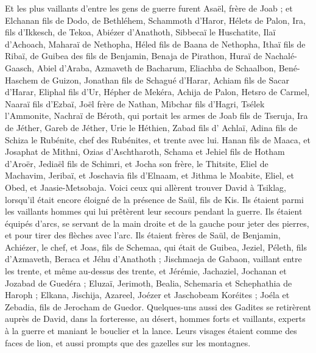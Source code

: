 \begin{multicols}{2}
Et les plus vaillants d'entre les gens de guerre furent Asaël, frère de Joab ; et Elchanan fils de Dodo, de Bethléhem,
Schammoth d'Haror, Hélets de Palon,
Ira, fils d'Ikkesch, de Tekoa, Abiézer d'Anathoth,
Sibbecaï le Huschatite, Ilaï d'Achoach,
Maharaï de Nethopha, Héled fils de Baana de Nethopha,
Ithaï fils de Ribaï, de Guibea des fils de Benjamin, Benaja de Pirathon,
Huraï de Nachalé-Gaasch, Abiel d'Araba,
Azmaveth de Bacharum, Eliachba de Schaalbon,
Bené-Haschem de Guizon, Jonathan fils de Schagué d'Harar,
Achiam fils de Sacar d'Harar, Eliphal fils d'Ur,
Hépher de Mekéra, Achija de Palon,
Hetsro de Carmel, Naaraï fils d'Ezbaï,
Joël frère de Nathan, Mibchar fils d'Hagri,
Tsélek l'Ammonite, Nachraï de Béroth, qui portait les armes de Joab fils de Tseruja,
Ira de Jéther, Gareb de Jéther,
Urie le Héthien, Zabad fils d' Achlaï,
Adina fils de Schiza le Rubénite, chef des Rubénites, et trente avec lui.
Hanan fils de Maaca, et Josaphat de Mithni,
Ozias d'Aschtharoth, Schama et Jehiel fils de Hotham d'Aroër,
Jediaël fils de Schimri, et Jocha son frère, le Thitsite,
Eliel de Machavim, Jeribaï, et Joschavia fils d'Elnaam, et Jithma le Moabite,
Eliel, et Obed, et Jaasie-Metsobaja.
\VerseOne{}Voici ceux qui allèrent trouver David à Tsiklag, lorsqu'il était encore éloigné de la présence de Saül, fils de Kis. Ils étaient parmi les vaillants hommes qui lui prêtèrent leur secours pendant la guerre.
Ils étaient équipés d'arcs, se servant de la main droite et de la gauche pour jeter des pierres, et pour tirer des flèches avec l'arc. Ils étaient frères de Saül, de Benjamin,
Achiézer, le chef, et Joas, fils de Schemaa, qui était de Guibea, Jeziel, Péleth, fils d'Azmaveth, Beraca et Jéhu d'Anathoth ;
Jischmaeja de Gabaon, vaillant entre les trente, et même au-dessus des trente, et Jérémie, Jachaziel, Jochanan et Jozabad de Guedéra ;
Eluzaï, Jerimoth, Bealia, Schemaria et Schephathia de Haroph ;
Elkana, Jischija, Azareel, Joézer et Jaschobeam Koréites ;
Joéla et Zebadia, fils de Jerocham de Guedor.
Quelques-uns aussi des Gadites se retirèrent auprès de David, dans la forteresse, au désert, hommes forts et vaillants, experts à la guerre et maniant le bouclier et la lance. Leurs visages étaient comme des faces de lion, et aussi prompts que des gazelles sur les montagnes.

\end{multicols}
